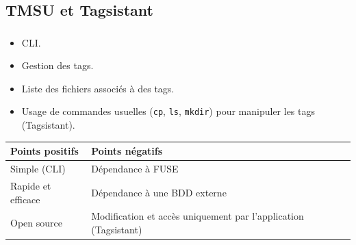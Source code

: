 \documentclass[10pt]{beamer}
\begin{document}
\subsection{TMSU et Tagsistant}
\begin{frame}
    \frametitle{\subsecname}
    \begin{itemize}
        \item CLI.
        \item Gestion des tags.
        \item Liste des fichiers associés à des tags.
        \item Usage de commandes usuelles (\texttt{cp}, \texttt{ls}, 
            \texttt{mkdir}) pour manipuler les tags (Tagsistant).
    \end{itemize}
    \pause
    \begin{center}
        \begin{tabularx}{8cm}{|X|X|} \hline
            \textbf{Points positifs} & \textbf{Points négatifs} \\ \hline
            Simple (CLI) & Dépendance à FUSE \\ \hline
            Rapide et efficace & Dépendance à une BDD externe \\ \hline
            Open source & Modification et accès uniquement par l'application (Tagsistant) \\ \hline
        \end{tabularx}
    \end{center}
\end{frame}
\end{document}

